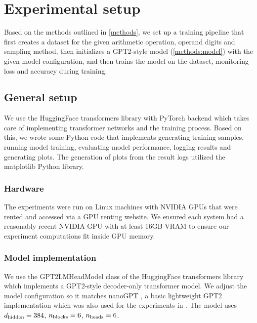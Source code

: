\section{Experimental setup}

Based on the methods outlined in \cref{methods}, we set up a training pipeline that first creates a dataset for the given arithmetic operation, operand digits and sampling method, then initializes a GPT2-style model (\cref{methods:model}) with the given model configuration, and then trains the model on the dataset, monitoring loss and accuracy during training.

\subsection{General setup}
\label{setup:general}



We use the HuggingFace transformers library \cite{github-hf} with PyTorch backend \cite{pytorch} which takes care of implementing transformer networks and the training process. Based on this, we wrote some Python code that implements generating training samples, running model training, evaluating model performance, logging results and generating plots. The generation of plots from the result logs utilized the matplotlib Python library.

\subsubsection{Hardware}
\label{setup:hardware}

The experiments were run on Linux machines with NVIDIA GPUs that were rented and accessed via a GPU renting website. We ensured each system had a reasonably recent NVIDIA GPU with at least 16GB VRAM to ensure our experiment computations fit inside GPU memory.

\subsubsection{Model implementation}

We use the GPT2LMHeadModel class of the HuggingFace transformers library which implements a GPT2-style decoder-only transformer model.
We adjust the model configuration so it matches nanoGPT \cite{nanogpt}, a basic lightweight GPT2 implementation which was also used for the experiments in \cite{teaching}. 
The model uses ${d_\textrm{hidden}}=384$, ${n_\textrm{blocks}}=6$, ${n_\textrm{heads}}=6$.

